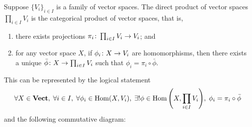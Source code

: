 \begin{definition}
    Suppose \({\{V_i\}}_{i \in I}\) is a family of vector spaces.
    The direct product of vector spaces \(\prod_{i \in I} V_i\)
    is the categorical product of vector spaces, that is,
    \begin{enumerate}[label={(\roman*)}, itemsep=0mm]
        \item there exists projections \(\pi_i\colon\prod_{i \in I} V_i\to V_i\); and
        \item for any vector space \(X\), if \(\phi_i\colon X\to V_i\) are homomorphisms,
            then there exists a unique \(\bar{\phi}\colon X\to\prod_{i \in I} V_i\)
            such that \(\phi_i = \pi_i\circ\bar{\phi}\).
    \end{enumerate}

    This can be represented by the logical statement
    \begin{equation*}
        \forall X \in \mathbf{Vect},\;
        \forall i \in I,\;
        \forall \phi_i \in \operatorname{Hom}(X,V_i),\;
        \exists! \phi \in \operatorname{Hom}\qty(X,\prod_{i \in I} V_i),\;
        \phi_i = \pi_i \circ \bar{\phi}
    \end{equation*}
    and the following commutative diagram:
    \begin{center}
    \end{center}
\end{definition}

